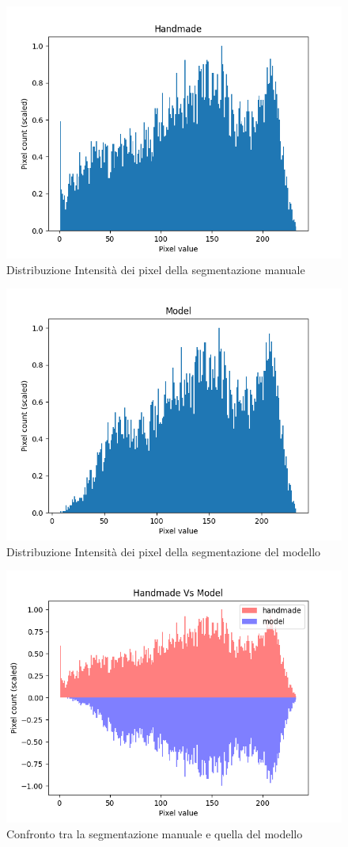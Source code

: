\begin{figure}[!ht]
        \centering
        \includegraphics[width=0.6\linewidth]{Immagini/handmade_scaled_hist.png}
        \caption{Distribuzione Intensità dei pixel della segmentazione manuale}
        \label{fig:distribuzione intensità dei pixel della segmentazione manuale}
\end{figure}

\begin{figure}[!ht]
        \centering
        \includegraphics[width=0.6\linewidth]{Immagini/model_scaled_hist.png}
        \caption{Distribuzione Intensità dei pixel della segmentazione del modello}
        \label{fig:distribuzione intensità dei pixel della segmentazione del modello}
\end{figure}

\begin{figure}[!ht]
    \centering
    \includegraphics[width=0.6\columnwidth]{Immagini/handmade_vs_model_scaled.png}
    \caption{Confronto tra la segmentazione manuale e quella del modello}
    \label{fig:confronto tra la segmentazione manuale e quella del modello}
\end{figure}

